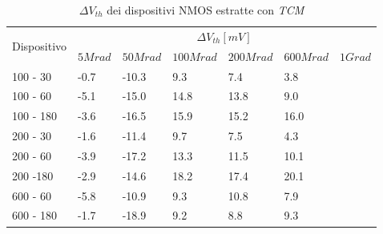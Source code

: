 \documentclass[12pt, letterpaper]{book}
\begin{document}
\begin{table}[H]
  \renewcommand{\arraystretch}{1.3}
  \begin{tabular}{m{2cm}  m{1.1cm} m{1.3cm} m{1.5cm} m{1.5cm} m{1.5cm} m{1cm}}
    \toprule
    \multirow{2}{*}{Dispositivo} & \multicolumn{6}{c}{$\Delta V_{th} [mV] $}                                                          \\
    \cmidrule{2-7}
                                 & $5Mrad$		& $50Mrad$ & $100Mrad$ & $200Mrad$ & $600Mrad$ & $1Grad$ \\
    \midrule
    100 - 30				& -0.7		& -10.3    & 9.3       & 7.4       & 3.8       &         \\
    \hline
    100 - 60				& -5.1		& -15.0    & 14.8      & 13.8      & 9.0       &         \\
    \hline
    100 - 180				& -3.6		& -16.5    & 15.9      & 15.2      & 16.0      &         \\
    \hline
    200 - 30				& -1.6		& -11.4    & 9.7       & 7.5       & 4.3       &         \\
    \hline
    200 - 60				& -3.9		& -17.2    & 13.3      & 11.5      & 10.1      &         \\
    \hline
    200 -180				& -2.9		& -14.6    & 18.2      & 17.4      & 20.1      &         \\
    \hline
    600 - 60				& -5.8		& -10.9    & 9.3       & 10.8      & 7.9       &         \\
    \hline
    600 - 180				& -1.7		& -18.9    & 9.2       & 8.8       & 9.3       &         \\
    \bottomrule
  \end{tabular}
  \caption{$\Delta V_{th}$ dei dispositivi NMOS estratte con \emph{TCM}}
  \label{tab:deltaVthTCMN}
\end{table}
\end{document}
